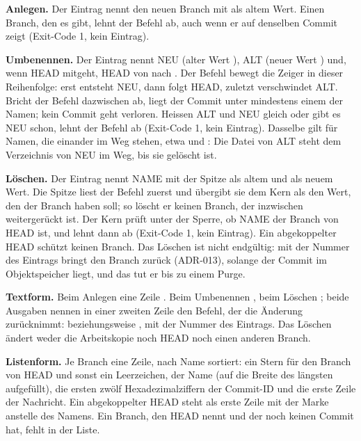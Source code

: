 {\bf Anlegen.} Der Eintrag nennt den neuen Branch mit \type{-} als altem Wert. Einen Branch, den
es gibt, lehnt der Befehl ab, auch wenn er auf denselben Commit zeigt (Exit-Code 1, kein Eintrag).

{\bf Umbenennen.} Der Eintrag nennt NEU (alter Wert \type{-}), ALT (neuer Wert \type{-}) und,
wenn HEAD mitgeht, HEAD von  nach . Der Befehl bewegt die Zeiger
in dieser Reihenfolge: erst entsteht NEU, dann folgt HEAD, zuletzt verschwindet ALT. Bricht der
Befehl dazwischen ab, liegt der Commit unter mindestens einem der Namen; kein Commit geht
verloren. Heissen ALT und NEU gleich oder gibt es NEU schon, lehnt der Befehl ab (Exit-Code 1,
kein Eintrag). Dasselbe gilt für Namen, die einander im Weg stehen, etwa  und
: Die Datei von ALT steht dem Verzeichnis von NEU im Weg, bis sie gelöscht ist.

{\bf Löschen.} Der Eintrag nennt NAME mit der Spitze als altem und \type{-} als neuem Wert. Die
Spitze liest der Befehl zuerst und übergibt sie dem Kern als den Wert, den der Branch haben soll;
so löscht er keinen Branch, der inzwischen weitergerückt ist. Der Kern prüft unter der Sperre,
ob NAME der Branch von HEAD ist, und lehnt dann ab (Exit-Code 1, kein Eintrag). Ein abgekoppelter
HEAD schützt keinen Branch. Das Löschen ist nicht endgültig:  mit der
Nummer des Eintrags bringt den Branch zurück (ADR-013), solange der Commit im Objektspeicher liegt,
und das tut er bis zu einem Purge.

{\bf Textform.} Beim Anlegen eine Zeile . Beim Umbenennen
, beim Löschen
; beide Ausgaben nennen in einer zweiten Zeile den
Befehl, der die Änderung zurücknimmt:  beziehungsweise
, mit der Nummer des Eintrags. Das Löschen ändert
weder die Arbeitskopie noch HEAD noch einen anderen Branch.

{\bf Listenform.} Je Branch eine Zeile, nach Name sortiert: ein Stern für den Branch von HEAD
und sonst ein Leerzeichen, der Name (auf die Breite des längsten aufgefüllt), die ersten zwölf
Hexadezimalziffern der Commit-ID und die erste Zeile der Nachricht. Ein abgekoppelter HEAD steht
als erste Zeile mit der Marke  anstelle des Namens. Ein Branch, den HEAD
nennt und der noch keinen Commit hat, fehlt in der Liste.

